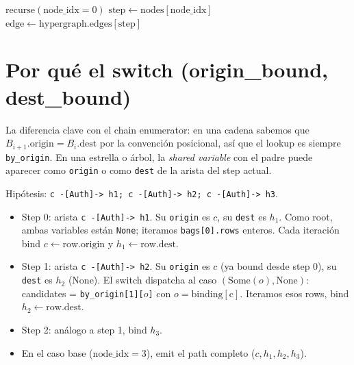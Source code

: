 \begin{algorithm}[H]
\caption{Tree-walk enumerator (versión simplificada)}
\(\mathrm{recurse}(\mathrm{node\_idx} = 0)\)\;
\BlankLine
{}
\(\mathrm{step} \leftarrow \mathrm{nodes[node\_idx]}\)\;
\(\mathrm{edge} \leftarrow \mathrm{hypergraph.edges[step]}\)\;
\end{algorithm}

\section{Por qué el switch (origin\_bound, dest\_bound)}

La diferencia clave con el chain enumerator: en una cadena sabemos
que \(B_{i+1}.\mathrm{origin} = B_i.\mathrm{dest}\) por la convención
posicional, así que el lookup es siempre \texttt{by\_origin}. En
una estrella o árbol, la \emph{shared variable} con el padre puede
aparecer como \texttt{origin} o como \texttt{dest} de la arista del
step actual.

\begin{ejemplo}
Hipótesis:
\texttt{c -[Auth]-> h1; c -[Auth]-> h2; c -[Auth]-> h3}.

\begin{itemize}
    \item Step 0: arista \texttt{c -[Auth]-> h1}. Su \texttt{origin}
    es \(c\), su \texttt{dest} es \(h_1\). Como root, ambas
    variables están \texttt{None}; iteramos \texttt{bags[0].rows}
    enteros. Cada iteración bind \(c \leftarrow \mathrm{row.origin}\)
    y \(h_1 \leftarrow \mathrm{row.dest}\).
    \item Step 1: arista \texttt{c -[Auth]-> h2}. Su \texttt{origin}
    es \(c\) (ya bound desde step 0), su \texttt{dest} es \(h_2\)
    (None). El switch dispatcha al caso
    \((\mathrm{Some}(o), \mathrm{None})\): candidates =
    \texttt{by\_origin[1][\(o\)]} con \(o = \mathrm{binding[c]}\).
    Iteramos esos rows, bind \(h_2 \leftarrow \mathrm{row.dest}\).
    \item Step 2: análogo a step 1, bind \(h_3\).
    \item En el caso base (\(\mathrm{node\_idx} = 3\)), emit el path
    completo (\(c, h_1, h_2, h_3\)).
\end{itemize}
\end{ejemplo}

